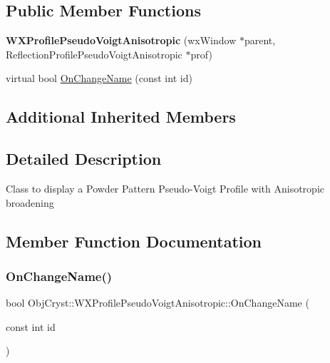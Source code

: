 \subsection*{Public Member Functions}
\begin{DoxyCompactItemize}
\item 
\mbox{\label{class_obj_cryst_1_1_w_x_profile_pseudo_voigt_anisotropic_ac8363ed4f6603947d644ae2e78fff9e5}} 
{\bfseries W\+X\+Profile\+Pseudo\+Voigt\+Anisotropic} (wx\+Window $\ast$parent, Reflection\+Profile\+Pseudo\+Voigt\+Anisotropic $\ast$prof)
\item 
virtual bool \mbox{\hyperlink{class_obj_cryst_1_1_w_x_profile_pseudo_voigt_anisotropic_a1551c8bb8fbfcb4e26a5e8398be20642}{On\+Change\+Name}} (const int id)
\end{DoxyCompactItemize}
\subsection*{Additional Inherited Members}


\subsection{Detailed Description}
Class to display a Powder Pattern Pseudo-\/\+Voigt Profile with Anisotropic broadening 

\subsection{Member Function Documentation}
\mbox{\label{class_obj_cryst_1_1_w_x_profile_pseudo_voigt_anisotropic_a1551c8bb8fbfcb4e26a5e8398be20642}} 
\subsubsection{\texorpdfstring{OnChangeName()}{OnChangeName()}}
{\footnotesize\ttfamily bool Obj\+Cryst\+::\+W\+X\+Profile\+Pseudo\+Voigt\+Anisotropic\+::\+On\+Change\+Name (\begin{DoxyParamCaption}\item[{const int}]{id }\end{DoxyParamCaption})\hspace{0.3cm}{\ttfamily [virtual]}}

